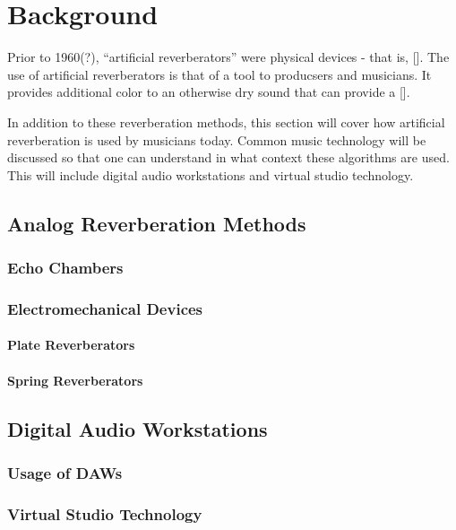 \chapter{Background}
Prior to 1960(?), ``artificial reverberators'' were physical devices - that is, [].
The use of artificial reverberators is that of a tool to producsers and musicians. It provides additional color to an otherwise dry sound that can provide a [].

In addition to these reverberation methods, this section will cover how artificial reverberation is used by musicians today. Common music technology will be discussed so that one can understand in what context these algorithms are used. This will include digital audio workstations and virtual studio technology.


\section{Analog Reverberation Methods}
\subsection{Echo Chambers}
\subsection{Electromechanical Devices}
\subsubsection{Plate Reverberators}
\subsubsection{Spring Reverberators}
\section{Digital Audio Workstations}
\subsection{Usage of DAWs}
\subsection{Virtual Studio Technology}
